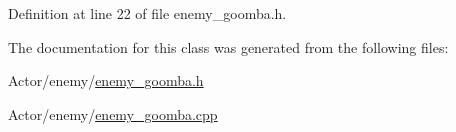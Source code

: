 Definition at line 22 of file enemy\+\_\+goomba.\+h.



The documentation for this class was generated from the following files\+:\begin{DoxyCompactItemize}
\item 
Actor/enemy/\hyperlink{enemy__goomba_8h}{enemy\+\_\+goomba.\+h}\item 
Actor/enemy/\hyperlink{enemy__goomba_8cpp}{enemy\+\_\+goomba.\+cpp}\end{DoxyCompactItemize}
